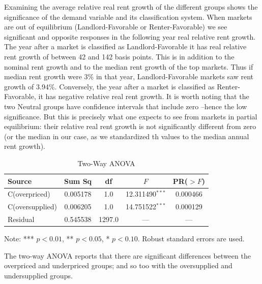 \documentclass[APA,Times1COL]{WileyNJDv5} %
\begin{document}
Examining the average relative real rent growth of the different groups shows the significance of the demand variable and its classification system. When markets are out of equilibrium (Landlord-Favorable or Renter-Favorable) we see significant and opposite responses in the following year real relative rent growth. The year after a market is classified as Landlord-Favorable it has real relative rent growth of between 42 and 142 basis points. This is in addition to the nominal rent growth and to the median rent growth of the top markets. Thus if median rent growth were 3\% in that year, Landlord-Favorable markets saw rent growth of 3.94\%. Conversely, the year after a market is classified as Renter-Favorable, it has negative relative real rent growth. 
It is worth noting that the two Neutral groups have confidence intervals that include zero --hence the low significance. But this is precisely what one expects to see from markets in partial equilibrium: their relative real rent growth is not significantly different from zero (or the median in our case, as we standardized th values to the median annual rent growth).

\begin{table}[t]
	\centering
	\begin{threeparttable}
		\caption{Two-Way ANOVA\label{tab:anova}}
		\begin{tabular}{lcccc}
			\toprule
			Source              & Sum Sq   & df    & $F$      & PR($>F$) \\
			\midrule
			C(overpriced)       & 0.005178 & 1.0   & 12.311490$^{***}$  & 0.000466 \\
			C(oversupplied)     & 0.006205 & 1.0   & 14.751522$^{***}$  & 0.000129 \\
			Residual            & 0.545538 & 1297.0& ---      & --- \\
			\bottomrule
		\end{tabular}
		\begin{tablenotes}
			\footnotesize
			\item Note: *** $p<0.01$, ** $p<0.05$, * $p<0.10$. Robust standard errors are used.
		\end{tablenotes}
	\end{threeparttable}
\end{table}

The two-way ANOVA reports that there are significant differences between the overpriced and underpriced groups; and so too with the oversupplied and undersupplied groups.
\end{document}
